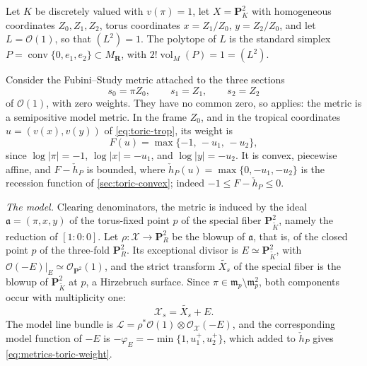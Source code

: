 \begin{example}
\label{ex:metrics-cl-toric-surface}
Let $K$ be discretely valued with $v(\pi)=1$, let
$X=\mathbf P^2_K$ with homogeneous coordinates $Z_0,Z_1,Z_2$, torus
coordinates $x=Z_1/Z_0$, $y=Z_2/Z_0$, and let $L=\mathcal O(1)$, so
that $(L^2)=1$. The polytope of $L$ is the standard simplex
$P=\operatorname{conv}\{0,e_1,e_2\}\subset M_{\mathbf R}$, with
$2!\operatorname{vol}_M(P)=1=(L^2)$.

Consider the Fubini--Study metric attached to the three sections
\[
 s_0=\pi Z_0,\qquad s_1=Z_1,\qquad s_2=Z_2
\]
of $\mathcal O(1)$, with zero weights. They have no common zero, so
 applies: the metric is a semipositive model
metric. In the frame $Z_0$, and in the tropical coordinates
$u=(v(x),v(y))$ of \eqref{eq:toric-trop}, its weight is
\begin{equation}
\label{eq:metrics-toric-weight}
 F(u)=\max\{-1,\,-u_1,\,-u_2\},
\end{equation}
since $\log|\pi|=-1$, $\log|x|=-u_1$, and $\log|y|=-u_2$. It is
convex, piecewise affine, and $F-\check h_P$ is bounded, where
$\check h_P(u)=\max\{0,-u_1,-u_2\}$ is the recession function of
\cref{sec:toric-convex}; indeed $-1\le F-\check h_P\le0$.

\emph{The model.} Clearing denominators, the metric is induced by the ideal
$\mathfrak a=(\pi,x,y)$ of the torus-fixed point $p$ of the special
fiber $\mathbf P^2_{\widetilde K}$, namely the reduction of
$[1:0:0]$. Let $\rho:\mathcal X\to\mathbf P^2_R$ be the blowup of
$\mathfrak a$, that is, of the closed point $p$ of the three-fold
$\mathbf P^2_R$. Its exceptional divisor is
$E\simeq\mathbf P^2_{\widetilde K}$, with
$\mathcal O(-E)|_E\simeq\mathcal O_{\mathbf P^2}(1)$, and the strict
transform $\widetilde{X_s}$ of the special fiber is the blowup of
$\mathbf P^2_{\widetilde K}$ at $p$, a Hirzebruch surface. Since
$\pi\in\mathfrak m_p\setminus\mathfrak m_p^2$, both components occur with
multiplicity one:
\[
 \mathcal X_s=\widetilde{X_s}+E .
\]
The model line bundle is
$\mathcal L=\rho^*\mathcal O(1)\otimes\mathcal O_{\mathcal X}(-E)$, and
the corresponding model function of $-E$ is
$-\varphi_E=-\min\{1,u_1^+,u_2^+\}$, which added to $\check h_P$ gives
\eqref{eq:metrics-toric-weight}.


\end{example}
